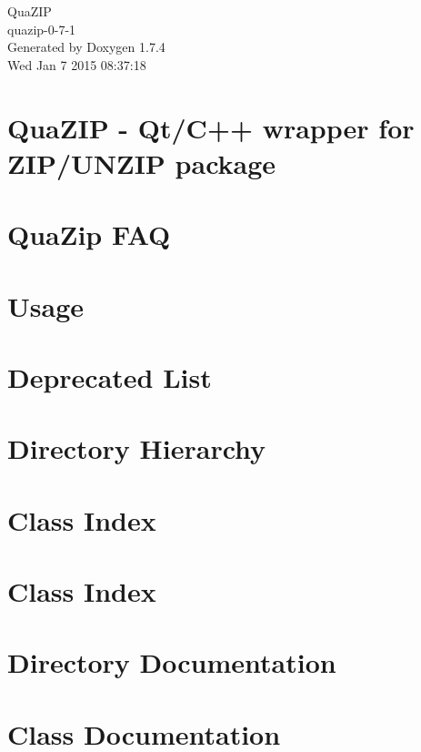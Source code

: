 \documentclass[a4paper]{book}
\begin{document}
\begin{titlepage}
\vspace*{7cm}
\begin{center}
{\Large QuaZIP \\[1ex]\large quazip-\/0-\/7-\/1 }\\
\vspace*{1cm}
{\large Generated by Doxygen 1.7.4}\\
\vspace*{0.5cm}
{\small Wed Jan 7 2015 08:37:18}\\
\end{center}
\end{titlepage}
\clearemptydoublepage
{}
\tableofcontents
\clearemptydoublepage
{}
\chapter{QuaZIP -\/ Qt/C++ wrapper for ZIP/UNZIP package}
\label{index}
\chapter{QuaZip FAQ}
\label{faq}

\chapter{Usage}
\label{usage}

\chapter{Deprecated List}
\label{deprecated}

\chapter{Directory Hierarchy}

\chapter{Class Index}

\chapter{Class Index}

\chapter{Directory Documentation}

\chapter{Class Documentation}















\printindex
\end{document}
